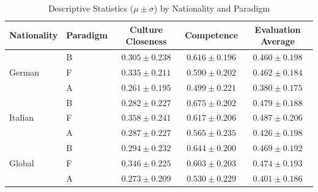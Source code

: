 \begin{table}[ht]
\centering
\begin{tabular}{llccc}
\toprule
Nationality & Paradigm & Culture Closeness & Competence & Evaluation Average \\
\midrule
\multirow{3}{1.5cm}{German}
 & B & $0.305 \pm 0.238$ & $0.616 \pm 0.196$ & $0.460 \pm 0.198$ \\
 & F & $0.335 \pm 0.211$ & $0.590 \pm 0.202$ & $0.462 \pm 0.184$ \\
 & A & $0.261 \pm 0.195$ & $0.499 \pm 0.221$ & $0.380 \pm 0.175$ \\
\midrule
\multirow{3}{1.5cm}{Italian}
 & B & $0.282 \pm 0.227$ & $0.675 \pm 0.202$ & $0.479 \pm 0.188$ \\
 & F & $0.358 \pm 0.241$ & $0.617 \pm 0.206$ & $0.487 \pm 0.206$ \\
 & A & $0.287 \pm 0.227$ & $0.565 \pm 0.235$ & $0.426 \pm 0.198$ \\
\midrule
\multirow{3}{1.5cm}{Global}
 & B & $0.294 \pm 0.232$ & $0.644 \pm 0.200$ & $0.469 \pm 0.192$ \\
 & F & $0.346 \pm 0.225$ & $0.603 \pm 0.203$ & $0.474 \pm 0.193$ \\
 & A & $0.273 \pm 0.209$ & $0.530 \pm 0.229$ & $0.401 \pm 0.186$ \\
\bottomrule
\end{tabular}
\caption{Descriptive Statistics ($\mu \pm \sigma$) by Nationality and Paradigm}
\label{tab:nat_desc_stats_updated}
\end{table}
